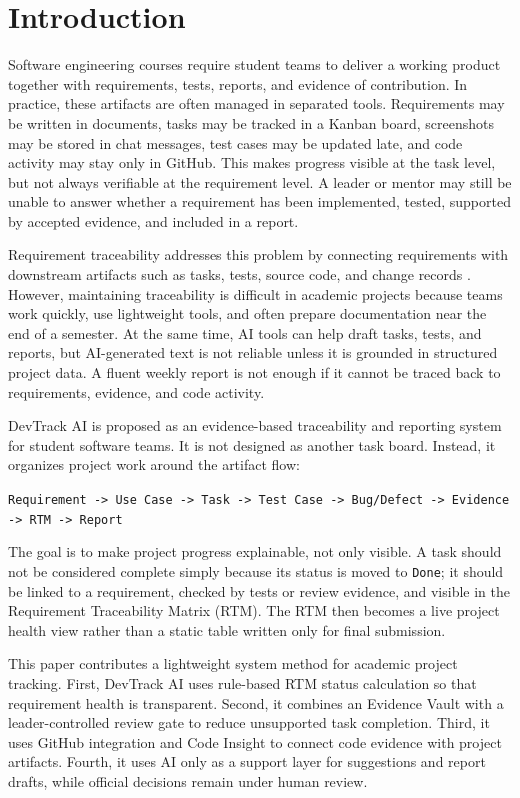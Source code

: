 \section{Introduction}
\label{sec:intro}


Software engineering courses require student teams to deliver a working product
together with requirements, tests, reports, and evidence of contribution. In
practice, these artifacts are often managed in separated tools. Requirements may be
written in documents, tasks may be tracked in a Kanban board, screenshots may be
stored in chat messages, test cases may be updated late, and code activity may stay
only in GitHub. This makes progress visible at the task level, but not always
verifiable at the requirement level. A leader or mentor may still be unable to
answer whether a requirement has been implemented, tested, supported by accepted
evidence, and included in a report.

Requirement traceability addresses this problem by connecting requirements with
downstream artifacts such as tasks, tests, source code, and change records
\cite{nlpTraceability,crossLevelTraceability}. However, maintaining traceability is
difficult in academic projects because teams work quickly, use lightweight tools,
and often prepare documentation near the end of a semester. At the same time, AI
tools can help draft tasks, tests, and reports, but AI-generated text is not reliable
unless it is grounded in structured project data. A fluent weekly report is not
enough if it cannot be traced back to requirements, evidence, and code activity.

DevTrack AI is proposed as an evidence-based traceability and reporting system for
student software teams. It is not designed as another task board. Instead, it
organizes project work around the artifact flow:

\begin{center}
\texttt{Requirement -> Use Case -> Task -> Test Case -> Bug/Defect -> Evidence -> RTM -> Report}
\end{center}

The goal is to make project progress explainable, not only visible. A task should
not be considered complete simply because its status is moved to \texttt{Done}; it
should be linked to a requirement, checked by tests or review evidence, and visible
in the Requirement Traceability Matrix (RTM). The RTM then becomes a live project
health view rather than a static table written only for final submission.

This paper contributes a lightweight system method for academic project tracking.
First, DevTrack AI uses rule-based RTM status calculation so that requirement health
is transparent. Second, it combines an Evidence Vault with a leader-controlled
review gate to reduce unsupported task completion. Third, it uses GitHub integration
and Code Insight to connect code evidence with project artifacts. Fourth, it uses AI
only as a support layer for suggestions and report drafts, while official decisions
remain under human review.
